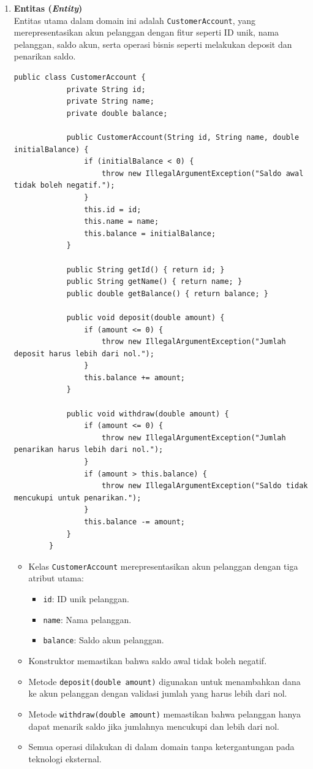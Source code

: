 \begin{enumerate}
	\item \textbf{Entitas (\textit{Entity})} \\
	Entitas utama dalam domain ini adalah \texttt{CustomerAccount}, yang merepresentasikan akun pelanggan dengan fitur seperti ID unik, nama pelanggan, saldo akun, serta operasi bisnis seperti melakukan deposit dan penarikan saldo.
	
	\begin{lstlisting}[style=JavaStyle, caption=CustomerAccount Entity]
		public class CustomerAccount {
			private String id;
			private String name;
			private double balance;
			
			public CustomerAccount(String id, String name, double initialBalance) {
				if (initialBalance < 0) {
					throw new IllegalArgumentException("Saldo awal tidak boleh negatif.");
				}
				this.id = id;
				this.name = name;
				this.balance = initialBalance;
			}
			
			public String getId() { return id; }
			public String getName() { return name; }
			public double getBalance() { return balance; }
			
			public void deposit(double amount) {
				if (amount <= 0) {
					throw new IllegalArgumentException("Jumlah deposit harus lebih dari nol.");
				}
				this.balance += amount;
			}
			
			public void withdraw(double amount) {
				if (amount <= 0) {
					throw new IllegalArgumentException("Jumlah penarikan harus lebih dari nol.");
				}
				if (amount > this.balance) {
					throw new IllegalArgumentException("Saldo tidak mencukupi untuk penarikan.");
				}
				this.balance -= amount;
			}
		}
	\end{lstlisting}

	\begin{itemize}
		\item Kelas \texttt{CustomerAccount} merepresentasikan akun pelanggan dengan tiga atribut utama:
		\begin{itemize}
			\item \texttt{id}: ID unik pelanggan.
			\item \texttt{name}: Nama pelanggan.
			\item \texttt{balance}: Saldo akun pelanggan.
		\end{itemize}
		\item Konstruktor memastikan bahwa saldo awal tidak boleh negatif.
		\item Metode \texttt{deposit(double amount)} digunakan untuk menambahkan dana ke akun pelanggan dengan validasi jumlah yang harus lebih dari nol.
		\item Metode \texttt{withdraw(double amount)} memastikan bahwa pelanggan hanya dapat menarik saldo jika jumlahnya mencukupi dan lebih dari nol.
		\item Semua operasi dilakukan di dalam domain tanpa ketergantungan pada teknologi eksternal.
	\end{itemize}
	

\end{enumerate}
